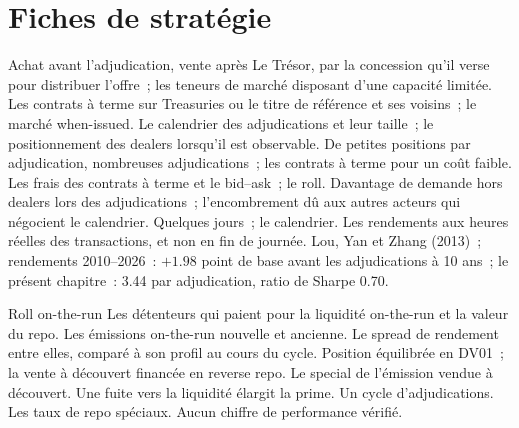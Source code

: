 \section{Fiches de stratégie}

\begin{strategyfile}{Achat avant l'adjudication, vente après}\label{strat:s2:supply-trades:auction}
 Le Trésor, par la concession qu'il verse pour distribuer l'offre~; les teneurs de marché disposant d'une capacité limitée.
 Les contrats à terme sur Treasuries ou le titre de référence et ses voisins~; le marché when-issued.
 Le calendrier des adjudications et leur taille~; le positionnement des dealers lorsqu'il est observable.
 De petites positions par adjudication, nombreuses adjudications~; les contrats à terme pour un coût faible.
 Les frais des contrats à terme et le bid--ask~; le roll.
 Davantage de demande hors dealers lors des adjudications~; l'encombrement dû aux autres acteurs qui négocient le calendrier.
 Quelques jours~; le calendrier.
 Les rendements aux heures réelles des transactions, et non en fin de journée.
 Lou, Yan et Zhang (2013)~; rendements 2010--2026~: $+1.98$ point de base avant les adjudications à 10 ans~; le présent chapitre~: 3.44 par adjudication, ratio de Sharpe
0.70.
\end{strategyfile}

\begin{strategyfile}{Roll on-the-run}\label{strat:s2:supply-trades:roll}
 Les détenteurs qui paient pour la liquidité on-the-run et la valeur du repo.
 Les émissions on-the-run nouvelle et ancienne.
 Le spread de rendement entre elles, comparé à son profil au cours du cycle.
 Position équilibrée en DV01~; la vente à découvert financée en reverse repo.
 Le special de l'émission vendue à découvert.
 Une fuite vers la liquidité élargit la prime.
 Un cycle d'adjudications.
 Les taux de repo spéciaux.
 Aucun chiffre de performance vérifié.
\end{strategyfile}

